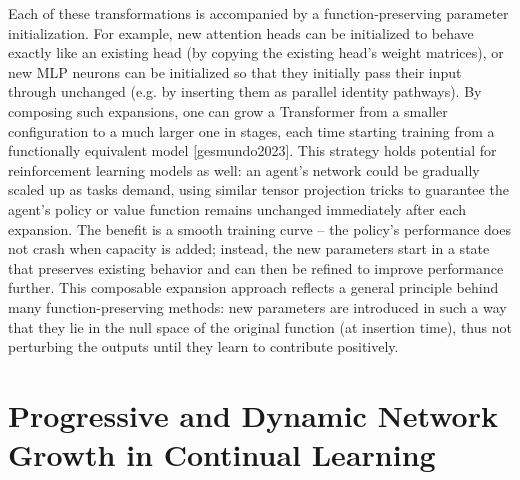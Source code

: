 Each of these transformations is accompanied by a function-preserving parameter initialization. For example, new attention heads can be initialized to behave exactly like an existing head (by copying the existing head’s weight matrices), or new MLP neurons can be initialized so that they initially pass their input through unchanged (e.g. by inserting them as parallel identity pathways). By composing such expansions, one can grow a Transformer from a smaller configuration to a much larger one in stages, each time starting training from a functionally equivalent model [gesmundo2023]. This strategy holds potential for reinforcement learning models as well: an agent’s network could be gradually scaled up as tasks demand, using similar tensor projection tricks to guarantee the agent’s policy or value function remains unchanged immediately after each expansion. The benefit is a smooth training curve – the policy’s performance does not crash when capacity is added; instead, the new parameters start in a state that preserves existing behavior and can then be refined to improve performance further. This composable expansion approach reflects a general principle behind many function-preserving methods: new parameters are introduced in such a way that they lie in the null space of the original function (at insertion time), thus not perturbing the outputs until they learn to contribute positively.

\section{Progressive and Dynamic Network Growth in Continual Learning}

